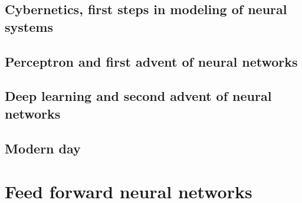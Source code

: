 \subsection{Cybernetics, first steps in modeling of neural systems}

\subsection{Perceptron and first advent of neural networks}

\subsection{Deep learning and second advent of neural networks}

\subsection{Modern day}


\section{Feed forward neural networks}

